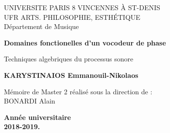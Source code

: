 \documentclass[a4paper,12pt,twoside]{report}
\author{KARYSTINAIOS Emmanouil Nikolaos}
\begin{document}
% 
\begin{titlepage}
    \begin{center}
        UNIVERSITE PARIS 8 VINCENNES À ST-DENIS \\
        UFR ARTS. PHILOSOPHIE, ESTHÉTIQUE \\
        Département de Musique
        \vspace*{7cm}
        
        \textbf{\Large{Domaines fonctionelles d'un vocodeur de phase}}
        
        \vspace{0.5cm}
        Techniques algebriques du processus sonore
        
        \vspace{3cm}
        
        \textbf{KARYSTINAIOS Emmanouil-Nikolaos}
        
        \vspace{4cm}    

        Mémoire de Master 2 réalisé sous la direction de : \\
        BONARDI Alain 

        \vspace{3cm}
        
        \textbf{Année universitaire \\ 2018-2019.}
        
        
        
        
        
    \end{center}
\end{titlepage}
\preface


\body








\lstlistoflistings 




\nocite{*}
\end{document}
